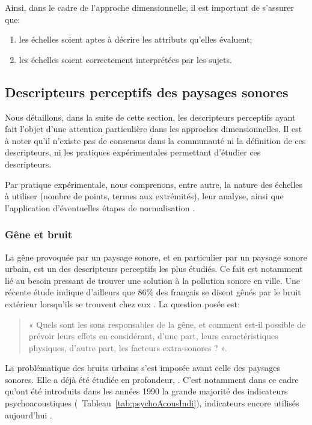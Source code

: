 Ainsi, dans le cadre de l'approche dimensionnelle, il est important de s'assurer que:

\begin{enumerate}
\item les échelles soient aptes à décrire les attributs qu'elles évaluent;
\item les échelles soient correctement interprétées par les sujets.
\end{enumerate}

\subsection{Descripteurs perceptifs des paysages sonores}
\label{sec:descripteursPercetifs}

Nous détaillons, dans la suite de cette section, les descripteurs perceptifs ayant fait l'objet d'une attention particulière dans les approches dimensionnelles. Il est à noter qu'il n'existe pas de consensus dans la communauté ni la définition de ces descripteurs, ni les pratiques expérimentales permettant d'étudier ces descripteurs.

Par pratique expérimentale, nous comprenons, entre autre, la nature des échelles à utiliser (nombre de points, termes aux extrémités), leur analyse, ainsi que l'application d'éventuelles étapes de normalisation \citep{aletta2016soundscape}.

\subsubsection{Gêne et bruit}

La gêne provoquée par un paysage sonore, et en particulier par un paysage sonore urbain, est un des descripteurs perceptifs les plus étudiés. Ce fait est notamment lié au besoin pressant de trouver une solution à la pollution sonore en ville. Une récente étude indique d'ailleurs que 86\% des français se disent gênés par le bruit extérieur lorsqu'ils se trouvent chez eux \citep{noiseFrench}. La question posée est: \\

\begin{quote}
« Quels sont les sons responsables de la gêne, et comment est-il possible de prévoir leurs effets en considérant, d'une part, leurs caractéristiques physiques, d'autre part, les facteurs extra-sonores ? ».
\end{quote}

La problématique des bruits urbains s'est imposée avant celle des paysages sonores. Elle a déjà été étudiée en profondeur, \citep{marquis2005noisea,marquis2005noiseb}. C'est notamment dans ce cadre qu'ont été introduits dans les années 1990 la grande majorité des indicateurs psychoacoustiques \citep{zwicker2013psychoacoustics}(\cf~Tableau~\ref{tab:psychoAcousIndi}), indicateurs encore utilisés aujourd'hui \citep{hall2013exploratory,fiebig2009psychoacoustic,yang2013psychoacoustical}.

